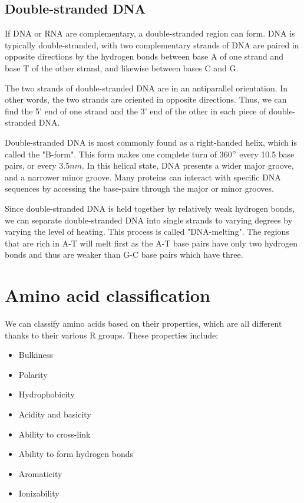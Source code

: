 \documentclass[11pt]{article}
\begin{document}
\subsection{Double-stranded DNA}
\label{sec:orgd9f1b8d}
If DNA or RNA are complementary, a double-stranded region can form. DNA is typically double-stranded, with two complementary strands of DNA are paired in opposite directions by the hydrogen bonds between base A of one strand and base T of the other strand, and likewise between bases C and G.


The two strands of double-stranded DNA are in an antiparallel orientation. In other words, the two strands are oriented in opposite directions. Thus, we can find the 5' end of one strand and the 3' end of the other in each piece of double-stranded DNA.


Double-stranded DNA is most commonly found as a right-handed helix, which is called the "B-form". This form makes one complete turn of 360\(\degree\) every 10.5 base pairs, or every 3.5\(\si{nm}\). In this helical state, DNA presents a wider major groove, and a narrower minor groove. Many proteins can interact with specific DNA sequences by accessing the base-pairs through the major or minor grooves.


Since double-stranded DNA is held together by relatively weak hydrogen bonds, we can separate double-stranded DNA into single strands to varying degrees by varying the level of heating. This process is called "DNA-melting". The regions that are rich in A-T will melt first as the A-T base pairs have only two hydrogen bonds and thus are weaker than G-C base pairs which have three.

\newpage
\section{Amino acid classification}
\label{sec:org6d1fc74}
We can classify amino acids based on their properties, which are all different thanks to their various R groups. These properties include:
\begin{itemize}
\item Bulkiness
\item Polarity
\item Hydrophobicity
\item Acidity and basicity
\item Ability to cross-link
\item Ability to form hydrogen bonds
\item Aromaticity
\item Ionizability
\end{itemize}
\end{document}
